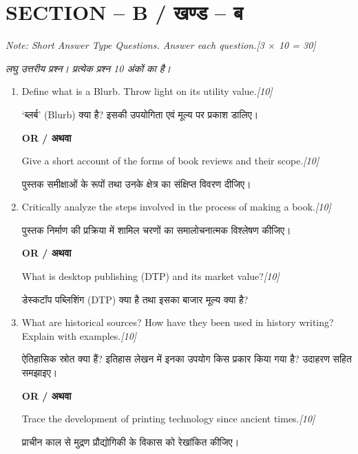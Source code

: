\documentclass[11pt,a4paper]{article}
\newcommand{\pts}[1]{\hfill \textit{[#1]}}
\begin{document}
\bigskip

\section*{SECTION -- B / खण्ड -- ब}
\noindent \textit{Note: Short Answer Type Questions. Answer each question.}\pts{3 $\times$ 10 = 30}

\noindent \textit{लघु उत्तरीय प्रश्न। प्रत्येक प्रश्न 10 अंकों का है।}

\begin{enumerate}[label=\textbf{\arabic*.},leftmargin=*,start=2,itemsep=12pt]

  \item Define what is a Blurb. Throw light on its utility value.\pts{10}
  
  `ब्लर्ब' (Blurb) क्या है? इसकी उपयोगिता एवं मूल्य पर प्रकाश डालिए।

  \begin{center}\textbf{OR / अथवा}\end{center}

  Give a short account of the forms of book reviews and their scope.\pts{10}
  
  पुस्तक समीक्षाओं के रूपों तथा उनके क्षेत्र का संक्षिप्त विवरण दीजिए।

  \item Critically analyze the steps involved in the process of making a book.\pts{10}
  
  पुस्तक निर्माण की प्रक्रिया में शामिल चरणों का समालोचनात्मक विश्लेषण कीजिए।

  \begin{center}\textbf{OR / अथवा}\end{center}

  What is desktop publishing (DTP) and its market value?\pts{10}
  
  डेस्कटॉप पब्लिशिंग (DTP) क्या है तथा इसका बाजार मूल्य क्या है?

  \item What are historical sources? How have they been used in history writing? Explain with examples.\pts{10}
  
  ऐतिहासिक स्रोत क्या हैं? इतिहास लेखन में इनका उपयोग किस प्रकार किया गया है? उदाहरण सहित समझाइए।

  \begin{center}\textbf{OR / अथवा}\end{center}

  Trace the development of printing technology since ancient times.\pts{10}
  
  प्राचीन काल से मुद्रण प्रौद्योगिकी के विकास को रेखांकित कीजिए।

\end{enumerate}
\end{document}
